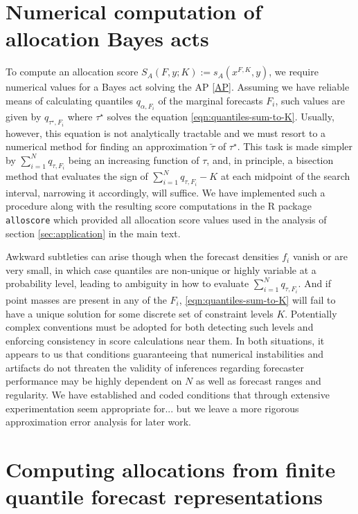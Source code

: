 \documentclass{article}
\begin{document}
\section{Numerical computation of allocation Bayes acts}
\label{sec:numeric}

To compute an allocation score $S_A(F,y;K) := s_A(x^{F,K},y)$, we require numerical values for a 
Bayes act solving the AP \eqref{AP}.  Assuming we have reliable means of calculating quantiles $q_{\alpha,F_i}$ 
of the marginal forecasts $F_i$,  
such values are given by $q_{\tau^{\star},F_i}$ where $\tau^{\star}$ solves the equation \eqref{eqn:quantiles-sum-to-K}.
Usually, however, this equation is not analytically tractable and we must resort to a numerical method
for finding an approximation $\tilde{\tau}$ of $\tau^{\star}$.  This task is made simpler by $\sum_{i=1}^N q_{\tau,F_i}$ being
an increasing function of $\tau$, and, in principle, a bisection method that evaluates the sign of $\sum_{i=1}^N q_{\tau,F_i} - K$
at each midpoint of the search interval, narrowing it accordingly, will suffice.  We have implemented such a procedure along with 
the resulting score computations in the 
R package \verb`alloscore` which provided all allocation score values used in the analysis of section \ref{sec:application} 
in the main text. 

Awkward subtleties can arise though when the forecast
densities $f_i$ vanish or are very small, in which case quantiles are non-unique or highly variable at a probability level, 
leading to ambiguity in how to evaluate $\sum_{i=1}^N q_{\tau,F_i}$. And if point masses are present in any of the $F_i$, 
\eqref{eqn:quantiles-sum-to-K} will fail to have a unique solution for some discrete set of constraint levels $K$.
Potentially complex conventions must be adopted for both detecting such levels and enforcing consistency in score calculations
near them. In both situations, it appears to us that conditions guaranteeing that numerical instabilities and artifacts do not 
threaten the validity of inferences regarding forecaster performance may be highly dependent on $N$ as well as forecast ranges
and regularity.  We have established and coded conditions that through extensive experimentation seem appropriate for...
but we leave a more rigorous approximation error analysis for later work.

\section{Computing allocations from finite quantile forecast representations}
\end{document}
